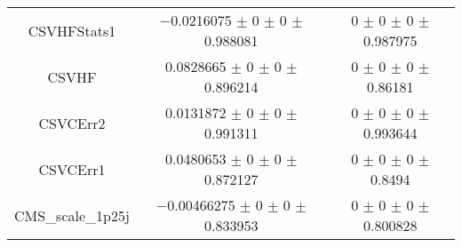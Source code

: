 \begin{table}
\begin{tabular}{ccc}
CSVHFStats1 & \num{-0.0216075} $\pm$ \num{0} $\pm$ \num{0} $\pm$ \num{0.988081} & \num{0} $\pm$ \num{0} $\pm$ \num{0} $\pm$ \num{0.987975}\\
CSVHF & \num{0.0828665} $\pm$ \num{0} $\pm$ \num{0} $\pm$ \num{0.896214} & \num{0} $\pm$ \num{0} $\pm$ \num{0} $\pm$ \num{0.86181}\\
CSVCErr2 & \num{0.0131872} $\pm$ \num{0} $\pm$ \num{0} $\pm$ \num{0.991311} & \num{0} $\pm$ \num{0} $\pm$ \num{0} $\pm$ \num{0.993644}\\
CSVCErr1 & \num{0.0480653} $\pm$ \num{0} $\pm$ \num{0} $\pm$ \num{0.872127} & \num{0} $\pm$ \num{0} $\pm$ \num{0} $\pm$ \num{0.8494}\\
CMS\_scale\_1p25j & \num{-0.00466275} $\pm$ \num{0} $\pm$ \num{0} $\pm$ \num{0.833953} & \num{0} $\pm$ \num{0} $\pm$ \num{0} $\pm$ \num{0.800828}\\
\bottomrule
\end{tabular}
\end{table}